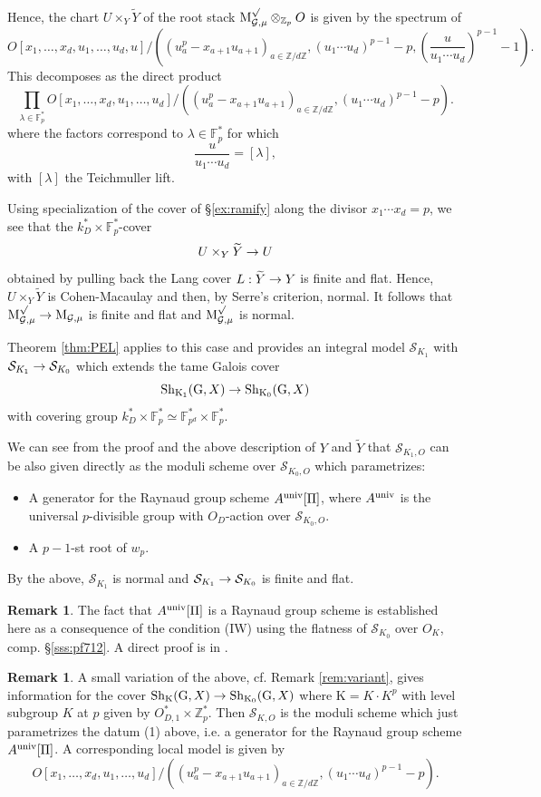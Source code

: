 \documentclass[reqno, 10pt]{amsart}
\makeatletter
\newcommand{\BF}{\ensuremath{\mathbb {F}}\xspace}
\newcommand{\BZ}{\ensuremath{\mathbb {Z}}\xspace}
\newcommand{\CG}{\ensuremath{\mathcal {G}}\xspace}
\newcommand{\CS}{\ensuremath{\mathcal {S}}\xspace}
\newcommand{\RG}{\ensuremath{\mathrm {G}}\xspace}
\newcommand{\RK}{\ensuremath{\mathrm {K}}\xspace}
\newcommand{\wt}{\widetilde}
\theoremstyle{definition}
\newtheorem{remark}[subsubsection]{Remark}
\numberwithin{equation}{subsection}
\numberwithin{subsubsection}{subsection}
\renewcommand{\to}{%
   \ifbool{@display}{\longrightarrow}{\rightarrow}%
   }
\newcommand{\Mloc}{{\rm M}}
\makeatother
\begin{document}
Hence, the chart $U\times_Y \wt Y$ of the root stack $\Mloc_{\CG,\mu}^{\sqrt{}}\otimes_{\BZ_p} O$ is
given by the spectrum of
\[
 O[x_1, \ldots , x_d, u_1,\ldots, u_d, u ]/((u_a^p-x_{a+1}u_{a+1})_{a\in \BZ/d\BZ}, (u_1\cdots u_d)^{p-1}-p, \left(\frac{u}{u_1\cdots u_d}\right)^{p-1}-1).
\]
This decomposes as the direct product
\[
\prod_{\lambda\in \BF_p^*} O[x_1, \ldots , x_d, u_1,\ldots, u_d ]/((u_a^p-x_{a+1}u_{a+1})_{a\in \BZ/d\BZ}, (u_1\cdots u_d)^{p-1}-p).
\]
where the factors correspond to $\lambda\in \BF_p^*$ for which 
\[
\frac{u}{u_1\cdots u_d}=[\lambda],
\]
with $[\lambda]$ the Teichmuller lift.

Using specialization of the cover of \S \ref{ex:ramify} along the divisor $x_1\cdots x_d=p$, we see that the $k^*_D\times \BF_p^*$-cover
\[
U\times_Y \wt Y\to U
\]
obtained by pulling back the Lang cover $L: \wt Y\to Y$ is finite and flat.  Hence, $U\times_Y \wt Y$ is Cohen-Macaulay and then, by Serre's criterion, normal. It follows that $\Mloc_{\CG,\mu}^{\sqrt{}}\to \Mloc_{\CG,\mu}$ is finite and flat and $\Mloc_{\CG,\mu}^{\sqrt{}}$ is normal.


Theorem \ref{thm:PEL} applies to this case and provides an integral model $\CS_{K_1}$ with $\CS_{K_1}\to \CS_{K_0}$ which extends the tame 
Galois cover 
\[
{\rm Sh}_{\RK_1}(\RG, X)\to {\rm Sh}_{\RK_0}(\RG, X)
\]
 with covering group $k^*_D\times \BF_p^*\simeq \BF_{p^d}^*\times\BF_p^*$. 
 
We can see from the proof and the above description of $Y$ and $\wt Y$ that 
$\CS_{K_1,O}$ can be also given directly as the moduli scheme over $\CS_{K_0, O}$ which parametrizes:
\begin{itemize}
\item[1)] A  generator for the Raynaud group scheme
$A^{\rm univ}[\Pi]$, where $A^{\rm univ}$ is the universal $p$-divisible group with $O_D$-action over $\CS_{K_0,O}$.

\item[2)]  A $p-1$-st root of $w_p$.
\end{itemize}

By the above,  $\CS_{K_1}$ is normal and $\CS_{K_1}\to \CS_{K_0}$ is finite and flat.
 \begin{remark}\label{rem:vanH}
The fact that $A^{\rm univ}[\Pi]$ is a Raynaud group scheme is established here as a consequence of the condition (IW) using the flatness of $\CS_{K_0}$ over $O_K$, comp. \S \ref{sss:pf712}. A direct proof is in \cite[Prop. 1.2]{Van}. 
\end{remark}
\begin{remark}\label{rem:nomult}
A small variation of the above, cf. Remark \ref{rem:variant}, gives information for the cover $
{\rm Sh}_{\RK}(\RG, X)\to {\rm Sh}_{\RK_0}(\RG, X)$ where $\RK=K\cdot K^p$ with level subgroup $K$ at $p$ given by $O^*_{D,1}\times \BZ_p^*$.
Then $\CS_{K, O}$ is the moduli scheme which just parametrizes the datum (1) above, i.e. a generator for the Raynaud group scheme
$A^{\rm univ}[\Pi]$. A corresponding local model is given by
\[
 O[x_1, \ldots , x_d, u_1,\ldots, u_d ]/((u_a^p-x_{a+1}u_{a+1})_{a\in \BZ/d\BZ}, (u_1\cdots u_d)^{p-1}-p).
\]


\end{remark}
\end{document}
